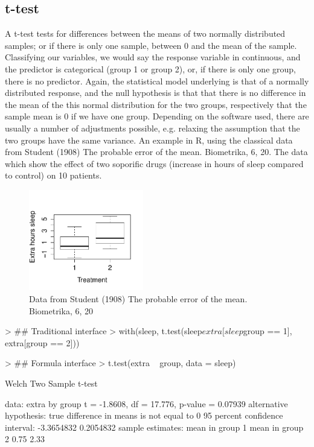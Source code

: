 \documentclass[a4paper,twoside]{tufte-book} %
\begin{document}
\subsection{t-test}

A t-test tests for differences between the means of two normally distributed samples; or if there is only one sample, between 0 and the mean of the sample. Classifying our variables, we would say the response variable in continuous, and the predictor is categorical (group 1 or group 2), or, if there is only one group, there is no predictor. Again, the statistical model underlying is that of a normally distributed response, and the null hypothesis is that that there is no difference in the mean of the this normal distribution for the two groups, respectively that the sample mean is 0 if we have one group. Depending on the software used, there are usually a number of adjustments possible, e.g. relaxing the assumption that the two groups have the same variance. An example in R, using the classical data from Student (1908) The probable error of the mean. Biometrika, 6, 20. The data which show the effect of two soporific drugs (increase in hours of sleep compared to control) on 10 patients. 

\begin{figure}[htbp]
\begin{center}
\includegraphics[width=5cm]{ttest}
\caption{Data from Student (1908) The probable error of the mean. Biometrika, 6, 20}
\label{fig: Student Sleep Data}
\end{center}
\end{figure}

\begin{Schunk}
\begin{Sinput}
> ## Traditional interface
> with(sleep, t.test(sleep$extra[sleep$group == 1], extra[group == 2]))
\end{Sinput}
\end{Schunk}
\begin{Schunk}
\begin{Sinput}
> ## Formula interface
> t.test(extra ~ group, data = sleep)
\end{Sinput}
\begin{Soutput}
	Welch Two Sample t-test

data:  extra by group
t = -1.8608, df = 17.776, p-value = 0.07939
alternative hypothesis: true difference in means is not equal to 0
95 percent confidence interval:
 -3.3654832  0.2054832
sample estimates:
mean in group 1 mean in group 2 
           0.75            2.33 
\end{Soutput}
\end{Schunk}
\end{document}
